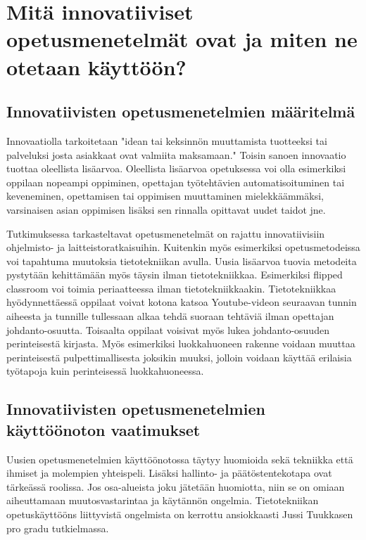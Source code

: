 \documentclass[utf8,bachelor]{gradu3}
\begin{document}




\chapter{Mitä innovatiiviset opetusmenetelmät ovat ja miten ne otetaan käyttöön?} %

\section{Innovatiivisten opetusmenetelmien määritelmä}
Innovaatiolla tarkoitetaan "idean tai keksinnön muuttamista tuotteeksi tai palveluksi josta asiakkaat ovat valmiita maksamaan." \parencite[][]{innovaatio} Toisin sanoen innovaatio tuottaa oleellista lisäarvoa. Oleellista lisäarvoa opetuksessa voi olla esimerkiksi oppilaan nopeampi oppiminen, opettajan työtehtävien automatisoituminen tai keveneminen, opettamisen tai oppimisen muuttaminen mielekkäämmäksi, varsinaisen asian oppimisen lisäksi sen rinnalla opittavat uudet taidot jne.

Tutkimuksessa tarkasteltavat opetusmenetelmät on rajattu innovatiivisiin ohjelmisto- ja laitteistoratkaisuihin. Kuitenkin myös esimerkiksi opetusmetodeissa voi tapahtuma muutoksia tietotekniikan avulla. Uusia lisäarvoa tuovia metodeita pystytään kehittämään myös täysin ilman tietotekniikkaa. Esimerkiksi flipped classroom voi toimia periaatteessa ilman tietotekniikkaakin. Tietotekniikkaa hyödynnettäessä oppilaat voivat kotona katsoa Youtube-videon seuraavan tunnin aiheesta ja tunnille tullessaan alkaa tehdä suoraan tehtäviä ilman opettajan johdanto-osuutta. \parencite[][]{flipped}Toisaalta oppilaat voisivat myös lukea johdanto-osuuden perinteisestä kirjasta. Myös esimerkiksi luokkahuoneen rakenne voidaan muuttaa perinteisestä pulpettimallisesta joksikin muuksi, jolloin voidaan käyttää erilaisia työtapoja kuin perinteisessä luokkahuoneessa.


\section{Innovatiivisten opetusmenetelmien käyttöönoton vaatimukset}
Uusien opetusmenetelmien käyttöönotossa täytyy huomioida sekä tekniikka että ihmiset ja molempien yhteispeli. Lisäksi hallinto- ja päätöstentekotapa ovat tärkeässä roolissa. Jos osa-alueista joku jätetään huomiotta, niin se on omiaan aiheuttamaan muutosvastarintaa ja käytännön ongelmia. Tietotekniikan opetuskäyttööns liittyvistä ongelmista on kerrottu ansiokkaasti Jussi Tuukkasen pro gradu tutkielmassa. \parencite[][s. 5-30]{kemia}
\end{document}
